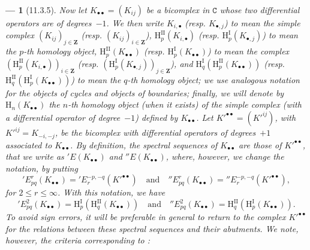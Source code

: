\documentclass[oneside]{amsart}
\theoremstyle{ega-env-style}
\newtheorem*{env}{---}
\theoremstyle{ega-thm-env-style}
\theoremstyle{ega-defn-env-style}
\def\bb{\mathbf}                    %
\def\cat{\mathtt}                   %
\def\leq{\leqslant}                 %
\def\HH{\mathrm{H}}                 %
\let\EGAOriginalLabel\label
\renewcommand{\label}[1]{\phantomsection\EGAOriginalLabel{#1}}
\begin{document}
\begin{env}[11.3.5]
\label{0.11.3.5}
Now let $K_{\bullet\bullet} = (K_{ij})$ be a bicomplex in $\cat{C}$ whose two differential operators are of degrees~$-1$.
We then write $K_{i,\bullet}$ (resp. $K_{\bullet,j}$) to mean the simple complex $(K_{ij})_{j\in\bb{Z}}$ (resp. $(K_{ij})_{i\in\bb{Z}}$), $\HH_{p}^\mathrm{II}(K_{i, \bullet})$ (resp. $\HH_{p}^\mathrm{I}(K_{\bullet, j})$) to mean the $p$-th homology object, $\HH_{p}^\mathrm{II}(K_{\bullet\bullet})$ (resp. $\HH_{p}^\mathrm{I}(K_{\bullet\bullet})$) to mean the complex $(\HH_{p}^\mathrm{II}(K_{i, \bullet}))_{i \in\bb{Z}}$ (resp. $(\HH_{p}^\mathrm{I}(K_{\bullet, j}))_{j \in\bb{Z}}$), and $\HH_q^\mathrm{I}(\HH_{p}^\mathrm{II}(K_{\bullet\bullet}))$ (resp. $\HH_q^\mathrm{II}(\HH_{p}^\mathrm{I}(K_{\bullet\bullet}))$) to mean the $q$-th homology object;
we use analogous notation for the objects of cycles and objects of boundaries;
finally, we will denote by $\HH_n(K_{\bullet\bullet})$ the $n$-th homology object (when it exists) of the simple complex (with a differential operator of degree~$-1$) defined by $K_{\bullet\bullet}$.
Let $K'^{\bullet\bullet}=(K'^{ij})$, with $K'^{ij}=K_{-i,-j}$, be the bicomplex with differential operators of degrees~$+1$ associated to $K_{\bullet\bullet}$.
By definition, the \emph{spectral sequences} of $K_{\bullet\bullet}$ are those of $K'^{\bullet\bullet}$, that we write as $'E(K_{\bullet\bullet})$ and $''E(K_{\bullet\bullet})$, where, however, we change the notation, by putting
\[
  'E_{pq}^{r}(K_{\bullet\bullet})
  = 'E_{r}^{-p,-q}(K'^{\bullet\bullet})
  \quad\text{and}\quad
  ''E_{pq}^{r}(K_{\bullet\bullet})
  = ''E_{r}^{-p,-q}(K'^{\bullet\bullet}), 
\]
for $2\leq r \leq \infty$.
With this notation, we have
\[
  'E_{pq}^{2}(K_{\bullet\bullet})
  = \HH_{p}^\mathrm{I}(\HH_{q}^\mathrm{II}(K_{\bullet\bullet}))
  \quad\text{and}\quad
  ''E_{pq}^{2}(K_{\bullet\bullet})
  = \HH_{q}^\mathrm{II}(\HH_{p}^\mathrm{I}(K_{\bullet\bullet})).
\]
To avoid sign errors, it will be preferable in general to return to the complex $K'^{\bullet\bullet}$ for the relations between these spectral sequences and their abutments.
We note, however, the criteria corresponding to :
\end{env}
\end{document}
